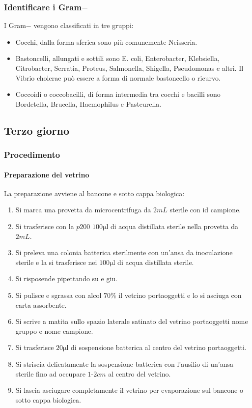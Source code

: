 		\subsubsection{Identificare i Gram$\mathbf{-}$}
		I Gram$-$ vengono classificati in tre gruppi:
		\begin{multicols}{3}
			\begin{itemize}
				\item Cocchi, dalla forma sferica sono pi\`u comunemente Neisseria.
				\item Bastoncelli, allungati e sottili sono E. coli, Enterobacter, Klebsiella, Citrobacter, Serratia, Proteus, Salmonella, Shigella, Pseudomonas e altri.
					Il Vibrio cholerae pu\`o essere a forma di normale bastoncello o ricurvo.
				\item Coccoidi o coccobacilli, di forma intermedia tra cocchi e bacilli sono Bordetella, Brucella, Haemophilus e Pasteurella.
			\end{itemize}
		\end{multicols}

	\subsection{Terzo giorno}

		\subsubsection{Procedimento}

			\paragraph{Preparazione del vetrino}
			La preparazione avviene al bancone e sotto cappa biologica:
			\begin{enumerate}
				\item Si marca una provetta da microcentrifuga da $2\si{mL}$ sterile con id campione.
				\item Si trasferisce con la $p200$ $100\si{\micro\litre}$ di acqua distillata sterile nella provetta da $2\si{mL}$.
				\item Si preleva una colonia batterica sterilmente con un'ansa da inoculazione sterile e la si trasferisce nei $100\si{\micro\litre}$ di acqua distillata sterile.
				\item Si risposende pipettando su e giu.
				\item Si pulisce e sgrassa con alcol $70\%$ il vetrino portaoggetti e lo si asciuga con carta assorbente.
				\item Si scrive a matita sullo spazio laterale satinato del vetrino portaoggetti nome gruppo e nome campione.
				\item Si trasferisce $20\si{\micro\litre}$ di sospensione batterica al centro del vetrino portaoggetti.
				\item Si striscia delicatamente la sospensione batterica con l'ausilio di un'ansa sterile fino ad occupare $1$-$2\si{cm}$ al centro del vetrino.
				\item Si lascia asciugare completamente il vetrino per evaporazione sul bancone o sotto cappa biologica.
			\end{enumerate}

